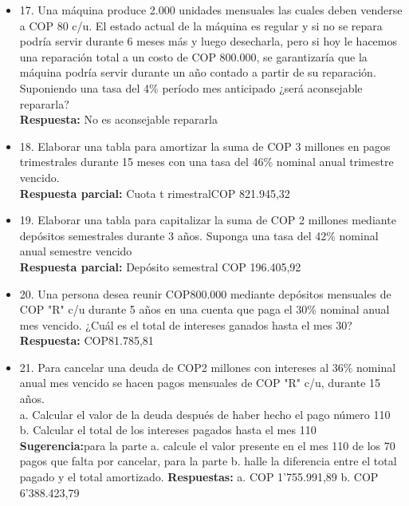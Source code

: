 \begin{itemize}
 \item 17. Una máquina produce 2.000 unidades mensuales las cuales deben venderse a COP 80 c/u. El estado actual de la máquina es regular y si no se repara podría servir durante 6 meses más y luego desecharla, pero si hoy le hacemos una reparación total a un costo de COP 800.000, se garantizaría que la máquina podría servir durante un año contado a partir de su reparación. Suponiendo una tasa del 4\% período mes anticipado ¿será aconsejable repararla?\\
       \textbf{Respuesta:} No es aconsejable repararla\\
       \medskip

 \item 18. Elaborar una tabla para amortizar la suma de COP 3 millones en pagos trimestrales durante 15 meses con una tasa del 46\% nominal anual trimestre vencido.\\
       \textbf{Respuesta parcial:} Cuota t rimestralCOP 821.945,32 \\
       \medskip

 \item 19. Elaborar una tabla para capitalizar la suma de COP 2 millones mediante depósitos semestrales durante 3 años. Suponga una tasa del 42\% nominal anual semestre vencido\\
       \textbf{Respuesta parcial:} Depósito semestral COP 196.405,92 \\
       \medskip

 \item 20. Una persona desea reunir COP800.000 mediante depósitos mensuales de  COP  "R" c/u durante 5 años en una cuenta que paga el 30\% nominal anual mes vencido. ¿Cuál es el total de intereses ganados hasta el mes 30?\\
       \textbf{Respuesta:} COP81.785,81\\
       \medskip

 \item 21. Para cancelar una deuda de COP2 millones con intereses al 36\% nominal anual mes vencido se hacen pagos mensuales de  COP  "R" c/u, durante 15 años.\\
       a. Calcular el valor de la deuda después de haber hecho el pago número 110\\
       b. Calcular el total de los intereses pagados hasta el mes 110\\
       \textbf{Sugerencia:}para la parte a. calcule el valor presente en el mes 110  de los 70 pagos que falta por cancelar, para la parte b. halle la diferencia entre el total pagado y el total amortizado.
       \textbf{Respuestas:} a. COP 1'755.991,89 \hspace{1,5 cm} b. COP 6'388.423,79\\
       \medskip


\end{itemize}
